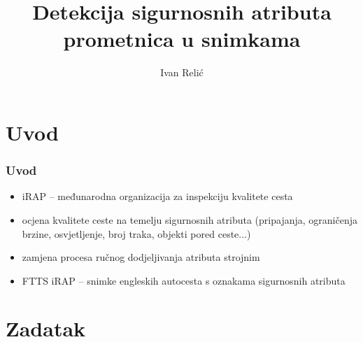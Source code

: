 \documentclass{beamer}
\author{Ivan Relić}
\title{Detekcija sigurnosnih atributa prometnica u snimkama}
\begin{document}
\begin{frame}
\titlepage 
\end{frame}

\section{Uvod}

\begin{frame}
\frametitle{Uvod}
\begin{itemize}
\item iRAP -- međunarodna organizacija za inspekciju kvalitete cesta
\item ocjena kvalitete ceste na temelju sigurnosnih atributa (pripajanja, ograničenja brzine, osvjetljenje, broj traka, objekti pored ceste...)
\item zamjena procesa ručnog dodjeljivanja atributa strojnim
\item FTTS iRAP -- snimke engleskih autocesta s oznakama sigurnosnih atributa
 \end{itemize}

\end{frame}

\section{Zadatak}
\end{document}
